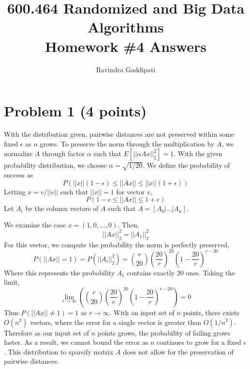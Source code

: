 \documentclass[letterpaper, 11pt]{article}
\begin{document}
\title{600.464 Randomized and Big Data Algorithms \\ Homework \#4 Answers}
\author{Ravindra Gaddipati}
\maketitle

\pagebreak
\section*{Problem 1 (4 points)}
With the distribution given, pairwise distances are not preserved within some fixed $\epsilon$ as $n$ grows. To preserve the norm through the multiplication by $A$, we normalize $A$ through factor $\alpha$ such that $E[||\alpha Ax||_2^2] = 1$. With the given probability distribution, we choose $\alpha = \sqrt{1/20}$. We define the probability of success as
$$P(||x||(1-\epsilon) \leq ||Ax|| \leq ||x||(1+\epsilon))$$
Letting $x = v/||v||$ such that $||x|| = 1$ for vector $v$,
$$P(1-\epsilon \leq ||Ax|| \leq 1+\epsilon)$$
Let $A_i$ be the column vectors of $A$ such that $A = [A_0 | \dots | A_n]$.

We examine the case $x=(1,0,\dots,0)$. Then, 
$$||Ax||^2_2 = ||A_1||^2_2$$
For this vector, we compute the probability the norm is perfectly preserved,
$$P(||Ax|| = 1) = P(||A_i||_2^2) = \binom{r}{20} \left(\frac{20}{r}\right)^{20}\left(1-\frac{20}{r}\right)^{r-20}$$
Where this represents the probability $A_1$ contains exactly 20 ones. Taking the limit,
$$\lim_{r \to \infty} \left(\binom{r}{20} \left(\frac{20}{r}\right)^{20}\left(1-\frac{20}{r}\right)^{r-20}\right) = 0$$
Thus $P(||Ax|| \neq 1) = 1$ as $r \to \infty$. With an input set of $n$ points, there exists $O(n^2)$ vectors, where the error for a single vector is greater than $O(1/n^2)$. Therefore as our input set of $n$ points grows, the probability of failing grows faster. As a result, we cannot bound the error as $n$ continues to grow for a fixed $\epsilon$. This distribution to sparsify matrix $A$ does not allow for the preservation of pairwise distances.

\pagebreak
\end{document}

